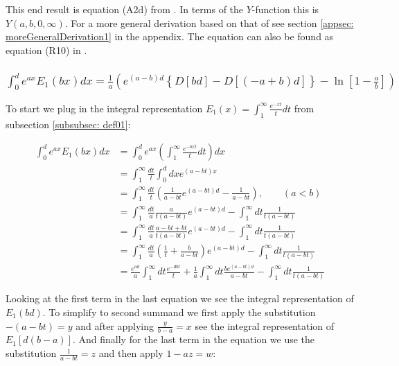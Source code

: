 \documentclass[bibliography=totocnumbered]{scrartcl}
\newcommand{\assume}[1][\text{MISSING PARAMETER}]{,\qquad\left(#1\right)}
\begin{document}
	This end result is equation (A2d) from \cite{boer1990calc}. In terms of the $Y$-function this is $Y\left(a,b,0,\infty\right)$. For a more general derivation based on that of \autocite[73\psq]{schloemilch} see section \ref{appsec: moreGeneralDerivation1} in the appendix. The equation can also be found as equation (R10) in \cite{sherman}.
	
	\subsubsection[A integral of E1, involving the exponential function]{$\int_{0}^{d}e^{ax}E_1\left(bx\right)dx=\frac{1}{a}\left(e^{\left(a-b\right)d}\left\{D\left[bd\right]-D\left[\left(-a+b\right)d\right]\right\}-\ln{\left[1-\frac{a}{b}\right]}\right)$}
	
	To start we plug in the integral representation $E_1\left(x\right)=\int_{1}^{\infty}\frac{e^{-xt}}{t}dt$ from subsection \ref{subsubsec: def01}:
	
	\begin{align}
		\int_{0}^{d}e^{ax}E_1\left(bx\right)dx&=\int_{0}^{d}e^{ax}\left(\int_{1}^{\infty}\frac{e^{-bxt}}{t}dt\right)dx\\
		&=\int_{1}^{\infty}\frac{dt}{t}\int_{0}^{d}dxe^{\left(a-bt\right)x}\\
		&=\int_{1}^{\infty}\frac{dt}{t}\left(\frac{1}{a-bt}e^{\left(a-bt\right)d}-\frac{1}{a-bt}\right)\assume[a<b]\\
		&=\int_{1}^{\infty}\frac{dt}{a}\frac{a}{t\left(a-bt\right)}e^{\left(a-bt\right)d}-\int_{1}^{\infty}dt\frac{1}{t\left(a-bt\right)}\\
		&=\int_{1}^{\infty}\frac{dt}{a}\frac{a-bt+bt}{t\left(a-bt\right)}e^{\left(a-bt\right)d}-\int_{1}^{\infty}dt\frac{1}{t\left(a-bt\right)}\\
		&=\int_{1}^{\infty}\frac{dt}{a}\left(\frac{1}{t}+\frac{b}{a-bt}\right)e^{\left(a-bt\right)d}-\int_{1}^{\infty}dt\frac{1}{t\left(a-bt\right)}\\
		&=\frac{e^{ad}}{a}\int_{1}^{\infty}dt\frac{e^{-dbt}}{t}+\frac{1}{a}\int_{1}^{\infty}dt\frac{be^{\left(a-bt\right)d}}{a-bt}-\int_{1}^{\infty}dt\frac{1}{t\left(a-bt\right)}
	\end{align}
	
	Looking at the first term in the last equation we see the integral representation of $E_1\left(bd\right)$. To simplify to second summand we first apply the substitution $-\left(a-bt\right)=y$ and after applying $\frac{y}{b-a}=x$ see the integral representation of $E_1\left[d\left(b-a\right)\right]$. And finally for the last term in the equation we use the substitution $\frac{1}{a-bt}=z$ and then apply $1-az=w$:
	
\end{document}
